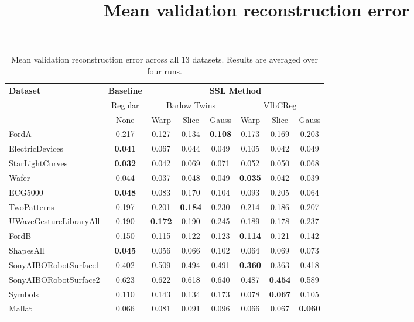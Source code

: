 \documentclass[../../thesis.tex]{subfiles}
\begin{document}
\begin{table}[H]
    \centering
    \title{Mean validation reconstruction error}
    \begin{adjustbox}{width=\textwidth}
    \begin{tabular}{lc|c|c|c|c|c|c} %
        \toprule
        \multirow{3}{*}{\textbf{Dataset}} & \multicolumn{1}{c}{\textbf{Baseline}} & \multicolumn{6}{c}{\textbf{SSL Method}} \\
                                         \cmidrule(lr){3-8}
                                          & \multicolumn{1}{c}{Regular}           & \multicolumn{3}{c}{Barlow Twins}    &  \multicolumn{3}{c}{VIbCReg} \\
                                                                                   \cmidrule(lr){3-5}                    \cmidrule(lr){6-8}
                                          &   None                                & Warp  & Slice & Gauss               & Warp & Slice & Gauss \\
                            
        \midrule
        FordA                   & 0.217 & 0.127 & 0.134 & \textbf{0.108} & 0.173 & 0.169 & 0.203 \\
        ElectricDevices         & \textbf{0.041} & 0.067 & 0.044 & 0.049 & 0.105 & 0.042 & 0.049 \\
        StarLightCurves         & \textbf{0.032} & 0.042 & 0.069 & 0.071 & 0.052 & 0.050 & 0.068 \\
        Wafer                   & 0.044 & 0.037 & 0.048 & 0.049 & \textbf{0.035} & 0.042 & 0.039 \\
        ECG5000                 & \textbf{0.048} & 0.083 & 0.170 & 0.104 & 0.093 & 0.205 & 0.064 \\
        TwoPatterns             & 0.197 & 0.201 & \textbf{0.184} & 0.230 & 0.214 & 0.186 & 0.207 \\
        UWaveGestureLibraryAll  & 0.190 & \textbf{0.172} & 0.190 & 0.245 & 0.189 & 0.178 & 0.237 \\
        FordB                   & 0.150 & 0.115 & 0.122 & 0.123 & \textbf{0.114} & 0.121 & 0.142 \\
        ShapesAll               & \textbf{0.045} & 0.056 & 0.066 & 0.102 & 0.064 & 0.069 & 0.073 \\
        SonyAIBORobotSurface1   & 0.402 & 0.509 & 0.494 & 0.491 & \textbf{0.360} & 0.363 & 0.418 \\
        SonyAIBORobotSurface2   & 0.623 & 0.622 & 0.618 & 0.640 & 0.487 & \textbf{0.454} & 0.589 \\
        Symbols                 & 0.110 & 0.143 & 0.134 & 0.173 & 0.078 & \textbf{0.067} & 0.105 \\
        Mallat                  & 0.066 & 0.081 & 0.091 & 0.096 & 0.066 & 0.067 & \textbf{0.060} \\
        \bottomrule
    \end{tabular}
    \end{adjustbox}
    \caption{Mean validation reconstruction error across all 13 datasets. Results are averaged over four runs.}
    \label{tab:mean_recons}
\end{table}
\end{document}
